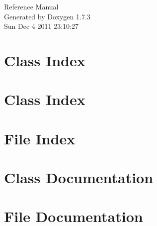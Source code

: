 \documentclass[a4paper]{book}
\begin{document}
\hypersetup{pageanchor=false}
\begin{titlepage}
\vspace*{7cm}
\begin{center}
{\Large Reference Manual}\\
\vspace*{1cm}
{\large Generated by Doxygen 1.7.3}\\
\vspace*{0.5cm}
{\small Sun Dec 4 2011 23:10:27}\\
\end{center}
\end{titlepage}
\clearemptydoublepage
{}
\tableofcontents
\clearemptydoublepage
{}
\hypersetup{pageanchor=true}
\chapter{Class Index}

\chapter{Class Index}

\chapter{File Index}

\chapter{Class Documentation}

























\chapter{File Documentation}

















\printindex
\end{document}
